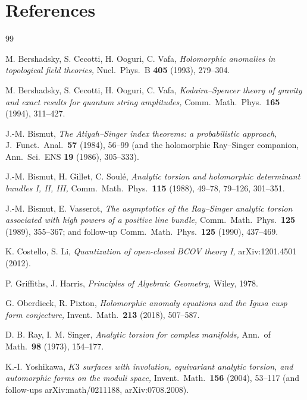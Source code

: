\documentclass[11pt]{article}
\theoremstyle{definition}
\begin{document}
\section*{References}
\begin{thebibliography}{99}

 M. Bershadsky, S. Cecotti, H. Ooguri, C. Vafa,
\textit{Holomorphic anomalies in topological field theories,}
Nucl.\ Phys.\ B \textbf{405} (1993), 279--304.

 M. Bershadsky, S. Cecotti, H. Ooguri, C. Vafa,
\textit{Kodaira--Spencer theory of gravity and exact results for
quantum string amplitudes,}
Comm.\ Math.\ Phys.\ \textbf{165} (1994), 311--427.

 J.-M. Bismut, \textit{The Atiyah--Singer index
theorems: a probabilistic approach,} J.~Funct.\ Anal.\ \textbf{57}
(1984), 56--99 (and the holomorphic Ray--Singer companion,
Ann.\ Sci.\ ENS \textbf{19} (1986), 305--333).

 J.-M. Bismut, H. Gillet, C. Soul\'e,
\textit{Analytic torsion and holomorphic determinant bundles I, II, III,}
Comm.\ Math.\ Phys.\ \textbf{115} (1988), 49--78, 79--126, 301--351.

 J.-M. Bismut, E. Vasserot,
\textit{The asymptotics of the Ray--Singer analytic torsion associated
with high powers of a positive line bundle,}
Comm.\ Math.\ Phys.\ \textbf{125} (1989), 355--367; and follow-up
Comm.\ Math.\ Phys.\ \textbf{125} (1990), 437--469.

 K. Costello, S. Li,
\textit{Quantization of open-closed BCOV theory I,}
arXiv:1201.4501 (2012).

 P. Griffiths, J. Harris,
\textit{Principles of Algebraic Geometry,} Wiley, 1978.

 G. Oberdieck, R. Pixton,
\textit{Holomorphic anomaly equations and the Igusa cusp form
conjecture,} Invent.\ Math.\ \textbf{213} (2018), 507--587.

 D. B. Ray, I. M. Singer,
\textit{Analytic torsion for complex manifolds,}
Ann.\ of Math.\ \textbf{98} (1973), 154--177.

 K.-I. Yoshikawa,
\textit{$K3$ surfaces with involution, equivariant analytic torsion,
and automorphic forms on the moduli space,}
Invent.\ Math.\ \textbf{156} (2004), 53--117 (and follow-ups
arXiv:math/0211188, arXiv:0708.2008).

\end{thebibliography}
\end{document}
